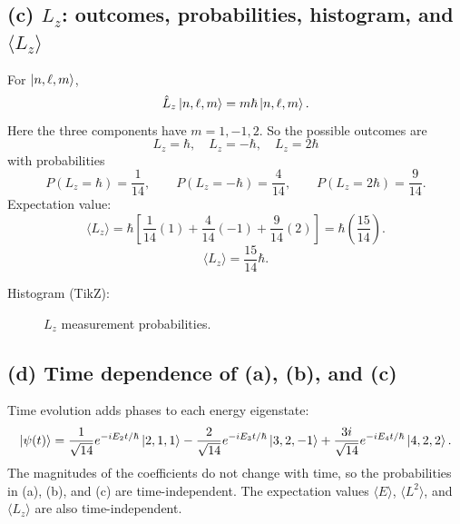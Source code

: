 \documentclass{article}
\begin{document}
\subsection*{(c) $L_z$: outcomes, probabilities, histogram, and $\langle L_z\rangle$}

For $\ket{n,\ell,m}$,
\[
\hat L_z\ket{n,\ell,m}=m\hbar\ket{n,\ell,m}.
\]
Here the three components have $m=1,-1,2$. So the possible outcomes are
\[
L_z=\hbar,\quad L_z=-\hbar,\quad L_z=2\hbar
\]
with probabilities
\[
P(L_z=\hbar)=\frac{1}{14},\qquad
P(L_z=-\hbar)=\frac{4}{14},\qquad
P(L_z=2\hbar)=\frac{9}{14}.
\]
Expectation value:
\[
\langle L_z\rangle
=\hbar\left[\frac{1}{14}(1)+\frac{4}{14}(-1)+\frac{9}{14}(2)\right]
=\hbar\left(\frac{15}{14}\right).
\]
\[
\boxed{\langle L_z\rangle=\frac{15}{14}\hbar.}
\]

Histogram (TikZ):
\begin{figure}[H]
\centering
{}
\caption{$L_z$ measurement probabilities.}
\end{figure}

\subsection*{(d) Time dependence of (a), (b), and (c)}

Time evolution adds phases to each energy eigenstate:
\[
\ket{\psi(t)}
=
\frac{1}{\sqrt{14}}e^{-iE_2 t/\hbar}\ket{2,1,1}
-\frac{2}{\sqrt{14}}e^{-iE_3 t/\hbar}\ket{3,2,-1}
+\frac{3i}{\sqrt{14}}e^{-iE_4 t/\hbar}\ket{4,2,2}.
\]
The magnitudes of the coefficients do not change with time, so the probabilities in
(a), (b), and (c) are time-independent. The expectation values $\langle E\rangle$,
$\langle L^2\rangle$, and $\langle L_z\rangle$ are also time-independent.
\end{document}
